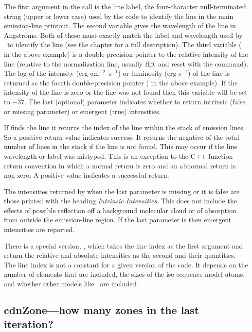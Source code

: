 The first argument in the call is the line label, the four-character
null-terminated string (upper or lower case) used by the code to identify
the line in the main emission-line printout.  The second variable gives
the wavelength of the line in Angstroms.  Both of these must exactly match
the label and wavelength used by \Cloudy\ to identify the line
(see the chapter  for a full description).
The third variable ( in the above
example) is a double-precision pointer to the relative intensity of the
line (relative to the normalization line, usually H$\beta$,
and reset with the
 command).
The log of the intensity (erg
cm$^{-2}$~s$^{-1}$) or luminosity
(erg s$^{-1}$) of the line is returned as the fourth double-precision pointer
( in the above example).
If the intensity of the line is zero or
the line was not found then this variable will be set to $-37$.
The last (optional) parameter indicates whether to return
intrinsic (false or missing parameter) or emergent (true) intensities.

If  finds the line it returns the index of the line within the
stack of emission lines.
So a positive return value indicates success.
It returns the negative of the total number of lines in the stack if the
line is not found.  This may occur if the line wavelength or label was
mistyped.  This is an exception to the C++ function return convention in
which a normal return is zero and an abnormal return is non-zero.  A positive
value indicates a successful return.

The intensities returned by when the last parameter is missing
or it is false are those printed with the
heading \emph{Intrinsic Intensities}.
This does not include the effects of possible
reflection off a background molecular cloud or of absorption from outside
the emission-line region.
If the last parameter is  then emergent
intensities are reported.

There is a special version, ,  which takes the line index as
the first argument and return the relative and absolute intensities as the
second and their quantities.  The line index is not a constant for a given
version of the code.  It depends on the number of elements that are included,
the sizes of the iso-sequence model atoms, and whether other models like
\htwo\ are included.

\subsection{cdnZone---how many zones in the last iteration?}

